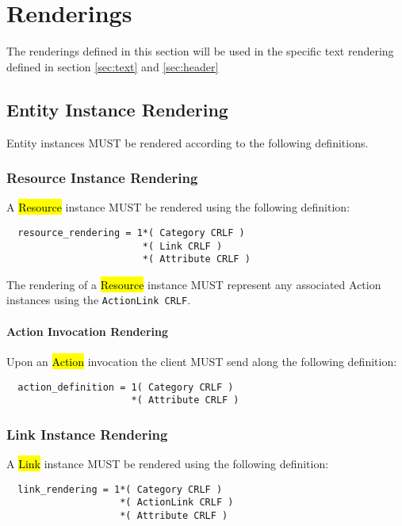 \documentclass[10pt,a4paper]{article}
\begin{document}
\section{Renderings}
\label{sec:renderings}

The renderings defined in this section will be used in the specific text rendering defined in section \ref{sec:text} and \ref{sec:header}

\subsection{Entity Instance Rendering}

Entity instances MUST be rendered according to the following definitions.

\subsubsection{Resource Instance Rendering}

A \hl{Resource} instance MUST be rendered using the following definition:

\begin{verbatim}
  resource_rendering = 1*( Category CRLF )
                        *( Link CRLF )
                        *( Attribute CRLF )
\end{verbatim}

The rendering of a \hl{Resource} instance MUST represent any associated Action instances using the {\tt ActionLink CRLF}.

\paragraph{Action Invocation Rendering}

Upon an \hl{Action} invocation the client MUST send along the following definition:

\begin{verbatim}
  action_definition = 1( Category CRLF )
                      *( Attribute CRLF )
\end{verbatim}

\subsubsection{Link Instance Rendering}

A \hl{Link} instance MUST be rendered using the following definition:

\begin{verbatim}
  link_rendering = 1*( Category CRLF )
                    *( ActionLink CRLF )
                    *( Attribute CRLF )
\end{verbatim}
\end{document}
